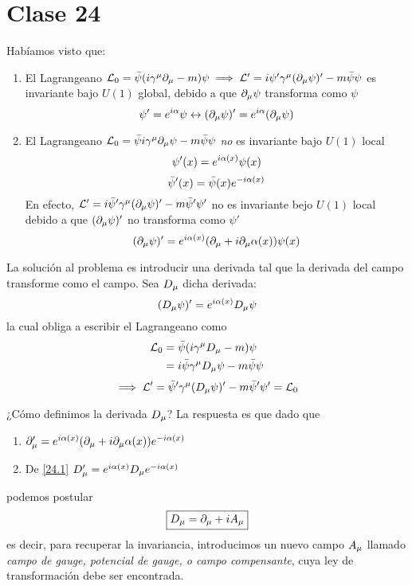 \section{Clase 24}
Habíamos visto que:
\begin{enumerate}
	\item El Lagrangeano $\mathcal{L}_0=\bar{\psi}(i\gamma^\mu \partial_\mu -m)\psi\implies \mathcal{L}'=i\psi'\gamma^\mu (\partial_\mu \psi)'-m\bar{\psi}\psi$ es invariante bajo $U(1)$ global, debido a que $\partial_\mu \psi$ transforma como $\psi$
	\begin{equation}
  \psi'=e^{i\alpha }\psi\leftrightarrow (\partial_\mu \psi)'=e^{i\alpha }(\partial_\mu \psi)
\end{equation}

\item 	
El Lagrangeano $\mathcal{L}_0=\bar{\psi}i\gamma^\mu \partial_\mu \psi-m\bar{\psi}\psi$ \textit{no} es invariante bajo $U(1)$ local
\begin{equation}
  \psi'(x)=e^{i\alpha(x)}\psi(x)
\end{equation}
\begin{equation}
  \bar{\psi}'(x)=\bar{\psi}(x)e^{-i\alpha(x)}
\end{equation}
En efecto,
$\mathcal{L}'=i\bar{\psi}'\gamma^\mu (\partial_\mu \psi)'-m\bar{\psi}'\psi'$ no es invariante bejo $U(1)$ local debido a que $(\partial_\mu \psi)'$ no transforma como $\psi'$
\begin{equation}
  (\partial_\mu \psi)'=e^{i\alpha(x)}(\partial_\mu +i\partial_\mu \alpha(x))\psi(x)
\end{equation}
\end{enumerate}

La solución al problema es introducir una derivada tal que la derivada del campo transforme como el campo. Sea $D_\mu $ dicha derivada:
\begin{equation}\label{24.1}
  (D_\mu \psi)'=e^{i\alpha(x)}D_\mu \psi
\end{equation}
la cual obliga a escribir el Lagrangeano como
\begin{align}
  \mathcal{L}_0&=\bar{\psi}(i\gamma^\mu D_\mu -m)\psi\\
  &=i\bar{\psi}\gamma^\mu D_\mu \psi-m\bar{\psi}\psi
\end{align}
\begin{equation}
  \implies \mathcal{L}'=\bar{\psi}'\gamma^\mu (D_\mu\psi)'-m\bar{\psi}'\psi'=\mathcal{L}_0
\end{equation}

¿Cómo definimos la derivada $D_\mu $? La respuesta es que dado que
\begin{enumerate}
	\item $\partial_\mu '=e^{i\alpha(x)}(\partial_\mu +i\partial_\mu \alpha(x))e^{-i\alpha(x)}$
	\item De \eqref{24.1} $D_\mu '=e^{i\alpha(x)}D_\mu e^{-i\alpha(x)}$
\end{enumerate}
podemos postular
\begin{equation}
  \boxed{D_\mu =\partial_\mu +iA_\mu }
\end{equation}
es decir, para recuperar la invariancia, introducimos un nuevo campo $A_\mu$ llamado \textit{campo de gauge, potencial de gauge, o campo compensante}, cuya ley de transformación debe ser encontrada.

